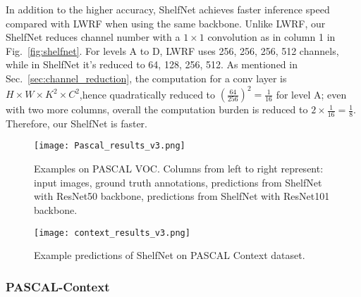 \documentclass[10pt,twocolumn,letterpaper]{article}
\begin{document}
In addition to the higher accuracy, ShelfNet achieves faster inference speed compared with LWRF when using the same backbone. Unlike LWRF, our ShelfNet reduces channel number with a $1 \times 1$ convolution as in column 1 in Fig.~\ref{fig:shelfnet}. For levels A to D, LWRF uses 256, 256, 256, 512 channels, while in ShelfNet it's reduced to 64, 128, 256, 512. As mentioned in Sec.~\ref{sec:channel_reduction}, the computation for a conv layer is $H \times W \times K^2 \times C^2$,hence quadratically reduced to $(\frac{64}{256})^2=\frac{1}{16}$ for level A; even with two more columns, overall the computation burden is reduced to $2 \times \frac{1}{16}=\frac{1}{8}$. Therefore, our ShelfNet is faster.



\begin{figure}[htb!]
    \centering
        \texttt{[image: Pascal\_results\_v3.png]}
        \caption{Examples on PASCAL VOC. Columns from left to right represent: input images, ground truth annotations, predictions from ShelfNet with ResNet50 backbone, predictions from ShelfNet with ResNet101 backbone.}
    \label{fig:pascal_result}
\end{figure} 

\begin{figure}[htb!]
    \centering
        \texttt{[image: context\_results\_v3.png]}
        \caption{Example predictions of ShelfNet on PASCAL Context  dataset.}
    \label{context_result}
    \label{context_figure}
\end{figure} 
\vspace{-0.1cm}

\subsubsection{PASCAL-Context}
\label{pcontext_section}
\end{document}
